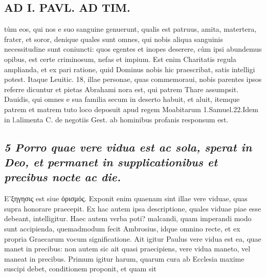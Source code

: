 \documentclass{article}
\begin{document}
\begin{pages}
\section*{AD I. PAVL. AD TIM. }
\marginpar{[ p.256 ]}\pstart tùm eos, qui nos e suo sanguine genuerunt, qualis est patruus, amita, matertera, frater, et soror, denique quales sunt omnes, qui nobis aliqua sanguinis necessitudine sunt coniuncti: quos egentes et inopes deserere, cùm ipsi abundemus opibus, est certe criminosum, nefas et impium. Est enim Charitatis regula amplianda, et ex pari ratione, quid Dominus nobis hic praescribat, satis intelligi potest. Itaque Leuitic. 18, illae personae, quas commemoraui, nobis parentes ipsos referre dicuntur et pietas Abrahami nora est, qui patrem Thare assumpsit. Dauidis, qui omnes e sua familia secum in deserto habuit, et aluit, itemque patrem et matrem tuto loco deposuit apud regem Moabitarum 1.Samuel.22.Idem in l.alimenta C. de negotiis Gest. ab hominibus profanis responsum est.  \pend
{}
{}
\subsection*{\textit{5 Porro quae vere vidua est ac sola, sperat in Deo, et permanet in supplicationibus et precibus nocte ac die. }}\pstart Ε’ξηγησις est siue ὁρισμός. Exponit enim quaenam sint illae vere viduae, quas supra honorare praecepit. Ex hac autem ipsa descriptione, quales viduae piae esse debeant, intelligitur. Haec autem verba poti? malcandi, quam imperandi modo sunt accipienda, quemadmodum fecit Ambrosius, idque omnino recte, et ex propria Graecarum vocum significatione. Ait igitur Paulus vere vidua est ea, quae manet in precibus: non autem sic ait quasi praecipiens, vere vidua maneto, vel maneat in precibus. Primum igitur harum, quarum cura ab Ecclesia maxime suscipi debet, conditionem proponit, et quam sit  \pend

\end{pages}
\end{document}
